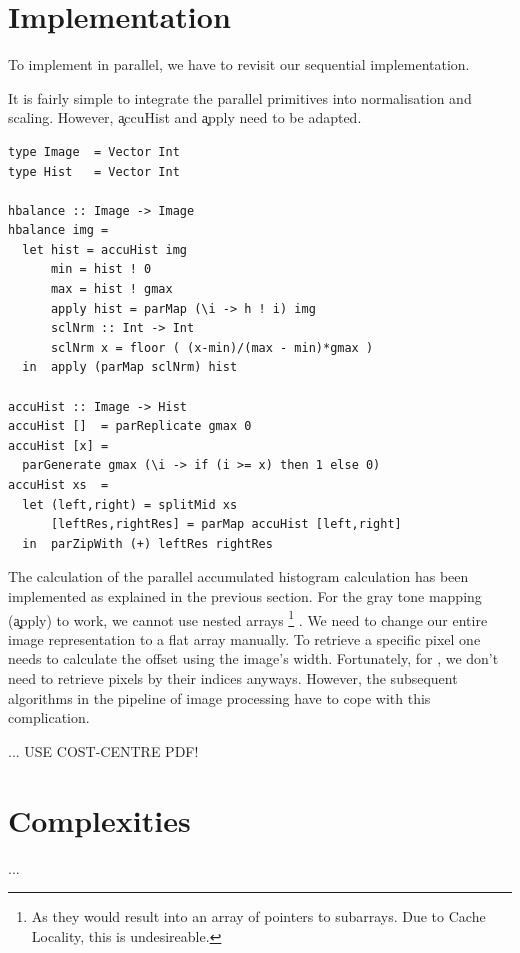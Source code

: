 \section{Implementation}
  To implement \algo in parallel, we have to revisit our sequential
  implementation.
  
  It is fairly simple to integrate
  the parallel primitives into normalisation and scaling.
  However, \c{accuHist} and \c{apply} need to be adapted.
  
  \begin{lstlisting}
type Image  = Vector Int
type Hist   = Vector Int

hbalance :: Image -> Image
hbalance img =
  let hist = accuHist img
      min = hist ! 0
      max = hist ! gmax
      apply hist = parMap (\i -> h ! i) img
      sclNrm :: Int -> Int
      sclNrm x = floor ( (x-min)/(max - min)*gmax )
  in  apply (parMap sclNrm) hist

accuHist :: Image -> Hist
accuHist []  = parReplicate gmax 0
accuHist [x] =
  parGenerate gmax (\i -> if (i >= x) then 1 else 0)
accuHist xs  =
  let (left,right) = splitMid xs
      [leftRes,rightRes] = parMap accuHist [left,right]
  in  parZipWith (+) leftRes rightRes
  \end{lstlisting}
  
  The calculation of the parallel accumulated histogram calculation
  has been implemented as explained in the previous section.
  For the gray tone mapping (\c{apply}) to work, we cannot use nested arrays
  \footnote{As they would result into an array of pointers to subarrays.
  Due to Cache Locality, this is undesireable.}
  . We need to change our entire image representation to a flat array manually.
  To retrieve a specific pixel one needs to calculate
  the offset using the image's width. Fortunately,
  for \algo, we don't need to retrieve pixels by their indices anyways.
  However, the subsequent algorithms in the pipeline of image processing
  have to cope with this complication.

  ...
  USE COST-CENTRE PDF!
    
\section{Complexities}
  ...
